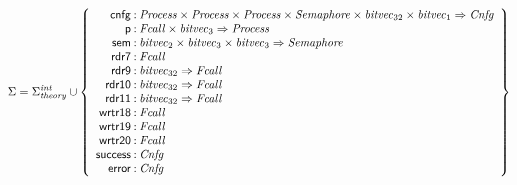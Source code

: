 \documentclass[a4paper]{article}
\def\lthtmlcheckvsize{\ifdim\ht\sizebox<\vsize 
  \ifdim\wd\sizebox<\hsize\expandafter\hfill\fi \expandafter\vfill
  \else\expandafter\vss\fi}%
\begin{document}
{\newpage\clearpage
{}%
$\displaystyle \Sigma = 
\Sigma^{\mathit{int}}_{\mathit{theory}}\cup\left\{
\begin{array}{r@{\>}c@{\>}l}
\mathsf{cnfg} & : & \mathit{Process} \times \mathit{Process} \times \mathit{Process} \times \mathit{Semaphore} \times \mathit{bitvec}_{32} \times \mathit{bitvec}_{1} \Rightarrow \mathit{Cnfg}\\
\mathsf{p} & : & \mathit{Fcall} \times \mathit{bitvec}_{3} \Rightarrow \mathit{Process}\\
\mathsf{sem} & : & \mathit{bitvec}_{2} \times \mathit{bitvec}_{3} \times \mathit{bitvec}_{3} \Rightarrow \mathit{Semaphore}\\
\mathsf{rdr7} & : & \mathit{Fcall}\\
\mathsf{rdr9} & : & \mathit{bitvec}_{32} \Rightarrow \mathit{Fcall}\\
\mathsf{rdr10} & : & \mathit{bitvec}_{32} \Rightarrow \mathit{Fcall}\\
\mathsf{rdr11} & : & \mathit{bitvec}_{32} \Rightarrow \mathit{Fcall}\\
\mathsf{wrtr18} & : & \mathit{Fcall}\\
\mathsf{wrtr19} & : & \mathit{Fcall}\\
\mathsf{wrtr20} & : & \mathit{Fcall}\\
\mathsf{success} & : & \mathit{Cnfg}\\
\mathsf{error} & : & \mathit{Cnfg}\\
\end{array}
\right\}
$%
\lthtmlindisplaymathZ
\lthtmlcheckvsize\clearpage}
\end{document}
